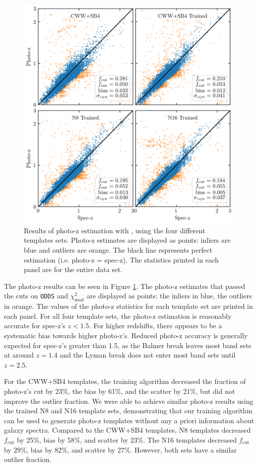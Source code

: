 \begin{figure}
    \centering
    \includegraphics{photoz_results.png}
    \caption{Results of photo-z estimation with \bpz, using the four different templates sets. Photo-z estimates are displayed as points: inliers are blue and outliers are orange. The black line represents perfect estimation (i.e. photo-z = spec-z). The statistics printed in each panel are for the entire data set.}
    \label{fig:photoz_results}
\end{figure}

The photo-z results can be seen in Figure \ref{fig:photoz_results}.
The photo-z estimates that passed the cuts on \texttt{ODDS} and $\chi_\text{mod}^2$ are displayed as points: the inliers in blue, the outliers in orange.
The values of the photo-z statistics for each template set are printed in each panel.
For all four template sets, the photo-z estimation is reasonably accurate for spec-z's $z < 1.5$.
For higher redshifts, there appears to be a systematic bias towards higher photo-z's.
Reduced photo-z accuracy is generally expected for spec-z's greater than 1.5, as the Balmer break leaves most band sets at around $z=1.4$ and the Lyman break does not enter most band sets until $z=2.5$.

For the CWW+SB4 templates, the training algorithm decreased the fraction of photo-z's cut by 23\%, the bias by 61\%, and the scatter by 21\%, but did not improve the outlier fraction.
We were able to achieve similar photo-z results using the trained N8 and N16 template sets, demonstrating that our training algorithm can be used to generate photo-z templates without any a priori information about galaxy spectra.
Compared to the CWW+SB4 templates, N8 templates decreased $f_\text{cut}$ by 25\%, bias by 58\%, and scatter by 23\%.
The N16 templates decreased $f_\text{cut}$ by 29\%, bias by 82\%, and scatter by 27\%.
However, both sets have a similar outlier fraction.

